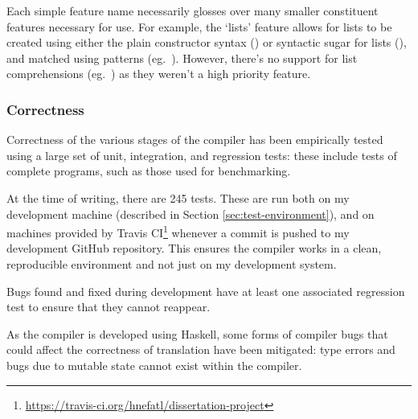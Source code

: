 \documentclass[dissertation.tex]{subfiles}
\begin{document}
{    Each simple feature name necessarily glosses over many smaller constituent features necessary for use. For example, the `lists' feature allows for lists to be created using either the plain constructor syntax () or syntactic sugar for lists (\haskell{[1,2,3]}), and matched using patterns (eg.\ \haskell{[x,y] = [1,2]}). However, there's no support for list comprehensions (eg.\ \haskell{[f x | x <- [1,2,3], even x]}) as they weren't a high priority feature.


    
    \subsubsection{Correctness}
    {
        Correctness of the various stages of the compiler has been empirically tested using a large set of unit, integration, and regression tests: these include tests of complete programs, such as those used for benchmarking.
        
        At the time of writing, there are 245 tests. These are run both on my development machine (described in Section \ref{sec:test-environment}), and on machines provided by Travis CI\footnote{\url{https://travis-ci.org/hnefatl/dissertation-project}} whenever a commit is pushed to my development GitHub repository. This ensures the compiler works in a clean, reproducible environment and not just on my development system.

        Bugs found and fixed during development have at least one associated regression test to ensure that they cannot reappear.

        As the compiler is developed using Haskell, some forms of compiler bugs that could affect the correctness of translation have been mitigated: type errors and bugs due to mutable state cannot exist within the compiler.
    }
}
\end{document}
